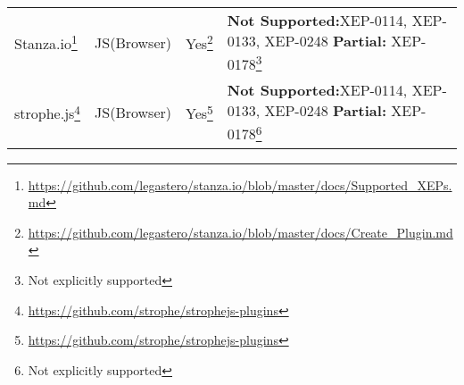 \begin{tabu}{l|l l X}
    Stanza.io\footnote{\url{https://github.com/legastero/stanza.io/blob/master/docs/Supported_XEPs.md}}
    & JS(Browser)
    & Yes\footnote{\url{https://github.com/legastero/stanza.io/blob/master/docs/Create_Plugin.md}}
    & \textbf{Not Supported:}\newline XEP-0114, XEP-0133, XEP-0248\newline
    \textbf{Partial:} XEP-0178\footnote{Not explicitly supported}
    \\

    strophe.js\footnote{\url{https://github.com/strophe/strophejs-plugins}}
    & JS(Browser)
    & Yes\footnote{\url{https://github.com/strophe/strophejs-plugins}}
    & \textbf{Not Supported:}\newline XEP-0114, XEP-0133, XEP-0248\newline
    \textbf{Partial:} XEP-0178\footnote{Not explicitly supported}
\end{tabu}

